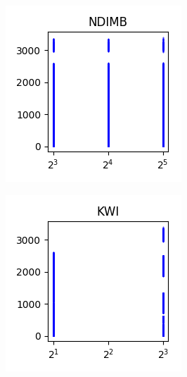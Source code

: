 \documentclass[sigconf,authorversion]{acmart}
\begin{document}
\begin{figure}[htb]\ContinuedFloat
    \centering
    \begin{subfigure}[b]{0.3\textwidth}
        \includegraphics[width=\textwidth]{img/NDIMB.png}
        \label{fig:ndimb}
    \end{subfigure}
    \begin{subfigure}[b]{0.3\textwidth}
        \includegraphics[width=\textwidth]{img/KWI.png}

\end{subfigure}
\end{figure}
\end{document}
